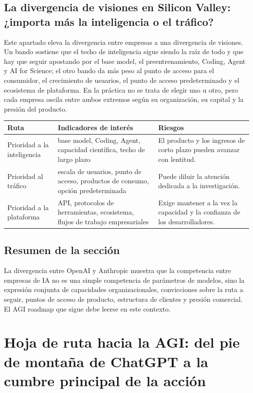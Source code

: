 \documentclass[a4paper]{article}
\begin{document}
\subsection{La divergencia de visiones en Silicon Valley: ¿importa más la inteligencia o el tráfico?}

Este apartado eleva la divergencia entre empresas a una divergencia de visiones. Un bando sostiene que el techo de inteligencia sigue siendo la raíz de todo y que hay que seguir apostando por el base model, el preentrenamiento, Coding, Agent y AI for Science; el otro bando da más peso al punto de acceso para el consumidor, el crecimiento de usuarios, el punto de acceso predeterminado y el ecosistema de plataforma. En la práctica no se trata de elegir uno u otro, pero cada empresa oscila entre ambos extremos según su organización, su capital y la presión del producto.

\noindent\begin{tabularx}{\textwidth}{p{}p{}X}
\toprule
Ruta & Indicadores de interés & Riesgos \\
\midrule
Prioridad a la inteligencia & base model, Coding, Agent, capacidad científica, techo de largo plazo & El producto y los ingresos de corto plazo pueden avanzar con lentitud. \\
Prioridad al tráfico & escala de usuarios, punto de acceso, productos de consumo, opción predeterminada & Puede diluir la atención dedicada a la investigación. \\
Prioridad a la plataforma & API, protocolos de herramientas, ecosistema, flujos de trabajo empresariales & Exige mantener a la vez la capacidad y la confianza de los desarrolladores. \\
\bottomrule
\end{tabularx}

\subsection{Resumen de la sección}

La divergencia entre OpenAI y Anthropic muestra que la competencia entre empresas de IA no es una simple competencia de parámetros de modelos, sino la expresión conjunta de capacidades organizacionales, convicciones sobre la ruta a seguir, puntos de acceso de producto, estructura de clientes y presión comercial. El AGI roadmap que sigue debe leerse en este contexto.
\section{Hoja de ruta hacia la AGI: del pie de montaña de ChatGPT a la cumbre principal de la acción}
\end{document}
